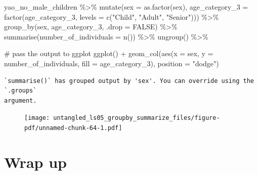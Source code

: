 \documentclass[
  letterpaper,
  DIV=11,
  numbers=noendperiod]{scrreprt}
\newenvironment{Shaded}{\begin{snugshade}}{\end{snugshade}}
\newcommand{\AttributeTok}[1]{\textcolor[rgb]{0.40,0.45,0.13}{#1}}
\newcommand{\CommentTok}[1]{\textcolor[rgb]{0.37,0.37,0.37}{#1}}
\newcommand{\ConstantTok}[1]{\textcolor[rgb]{0.56,0.35,0.01}{#1}}
\newcommand{\FunctionTok}[1]{\textcolor[rgb]{0.28,0.35,0.67}{#1}}
\newcommand{\NormalTok}[1]{\textcolor[rgb]{0.00,0.23,0.31}{#1}}
\newcommand{\SpecialCharTok}[1]{\textcolor[rgb]{0.37,0.37,0.37}{#1}}
\newcommand{\StringTok}[1]{\textcolor[rgb]{0.13,0.47,0.30}{#1}}
\begin{document}
\begin{tcolorbox}
\begin{Shaded}
\begin{Highlighting}[]
\NormalTok{yao\_no\_male\_children }\SpecialCharTok{\%\textgreater{}\%} 
  \FunctionTok{mutate}\NormalTok{(}\AttributeTok{sex =} \FunctionTok{as.factor}\NormalTok{(sex), }
         \AttributeTok{age\_category\_3 =} \FunctionTok{factor}\NormalTok{(age\_category\_3, }
                                 \AttributeTok{levels =} \FunctionTok{c}\NormalTok{(}\StringTok{"Child"}\NormalTok{, }
                                            \StringTok{"Adult"}\NormalTok{, }
                                            \StringTok{"Senior"}\NormalTok{))) }\SpecialCharTok{\%\textgreater{}\%} 
  \FunctionTok{group\_by}\NormalTok{(sex, age\_category\_3, }\AttributeTok{.drop =} \ConstantTok{FALSE}\NormalTok{) }\SpecialCharTok{\%\textgreater{}\%} 
  \FunctionTok{summarise}\NormalTok{(}\AttributeTok{number\_of\_individuals =} \FunctionTok{n}\NormalTok{()) }\SpecialCharTok{\%\textgreater{}\%} 
  \FunctionTok{ungroup}\NormalTok{() }\SpecialCharTok{\%\textgreater{}\%} 
  
  \CommentTok{\# pass the output to ggplot}
  \FunctionTok{ggplot}\NormalTok{() }\SpecialCharTok{+} 
  \FunctionTok{geom\_col}\NormalTok{(}\FunctionTok{aes}\NormalTok{(}\AttributeTok{x =}\NormalTok{ sex, }\AttributeTok{y =}\NormalTok{ number\_of\_individuals, }\AttributeTok{fill =}\NormalTok{ age\_category\_3), }
           \AttributeTok{position =} \StringTok{"dodge"}\NormalTok{)}
\end{Highlighting}
\end{Shaded}

\begin{verbatim}
`summarise()` has grouped output by 'sex'. You can override using the `.groups`
argument.
\end{verbatim}

\begin{figure}[H]

{\centering \texttt{[image: untangled\_ls05\_groupby\_summarize\_files/figure-pdf/unnamed-chunk-64-1.pdf]}

}

\end{figure}

\end{tcolorbox}

\hypertarget{wrap-up-7}{%
\section{Wrap up}\label{wrap-up-7}}
\end{document}
